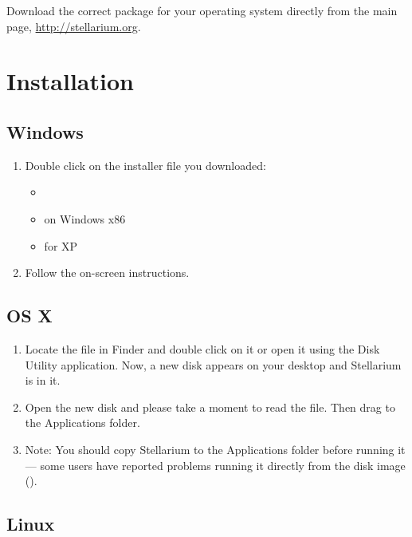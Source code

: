 Download the correct package for your operating system directly from the main page,
\url{http://stellarium.org}.

\section{Installation}
\label{sec:GettingStarted:Installation}

\subsection{Windows}

\begin{enumerate}
\item Double click on the installer file you downloaded:
\begin{itemize}
\item {}
\item {} on Windows x86
\item {} for XP
\end{itemize}
\item Follow the on-screen instructions.
\end{enumerate}

\subsection{OS X}

\begin{enumerate}
\item
  Locate the  file in
  Finder and double click on it or open it using the Disk Utility
  application. Now, a new disk appears on your desktop and Stellarium is
  in it.
\item
  Open the new disk and please take a moment to read the  file.
  Then drag  to the Applications folder.
\item
  Note: You should copy Stellarium to the Applications folder before
  running it --- some users have reported problems running it directly
  from the disk image ().
\end{enumerate}

\subsection{Linux}

